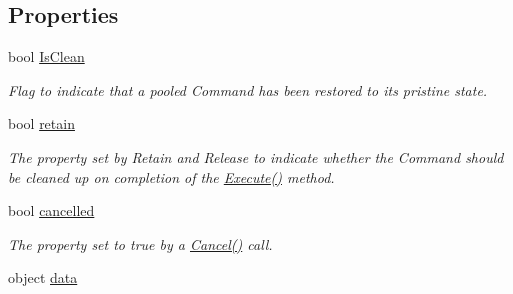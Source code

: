 \subsection*{Properties}
\begin{DoxyCompactItemize}
\item 
bool \hyperlink{interfacestrange_1_1extensions_1_1command_1_1api_1_1_i_command_a66e999177d73a0681d307d0b250cb338}{Is\-Clean}
\begin{DoxyCompactList}\small\item\em Flag to indicate that a pooled Command has been restored to its pristine state. \end{DoxyCompactList}\item 
\hypertarget{interfacestrange_1_1extensions_1_1command_1_1api_1_1_i_command_ac69e1fd7542d521e9e04c24bc47791bb}{bool \hyperlink{interfacestrange_1_1extensions_1_1command_1_1api_1_1_i_command_ac69e1fd7542d521e9e04c24bc47791bb}{retain}}\label{interfacestrange_1_1extensions_1_1command_1_1api_1_1_i_command_ac69e1fd7542d521e9e04c24bc47791bb}

\begin{DoxyCompactList}\small\item\em The property set by {\ttfamily Retain} and {\ttfamily Release} to indicate whether the Command should be cleaned up on completion of the {\ttfamily \hyperlink{interfacestrange_1_1extensions_1_1command_1_1api_1_1_i_command_a49ddf3bbaf19624534fa99fa4725feca}{Execute()}} method. \end{DoxyCompactList}\item 
bool \hyperlink{interfacestrange_1_1extensions_1_1command_1_1api_1_1_i_command_a213e1477e49f74dbbaa9a85887af4b5b}{cancelled}
\begin{DoxyCompactList}\small\item\em The property set to true by a \hyperlink{interfacestrange_1_1extensions_1_1command_1_1api_1_1_i_command_afe6c708912de7fe65dbe44d1ba83b547}{Cancel()} call. \end{DoxyCompactList}\item 
\hypertarget{interfacestrange_1_1extensions_1_1command_1_1api_1_1_i_command_afa2693fc9c9747093acde1dcab858570}{object \hyperlink{interfacestrange_1_1extensions_1_1command_1_1api_1_1_i_command_afa2693fc9c9747093acde1dcab858570}{data}}\label{interfacestrange_1_1extensions_1_1command_1_1api_1_1_i_command_afa2693fc9c9747093acde1dcab858570}


\end{DoxyCompactItemize}
